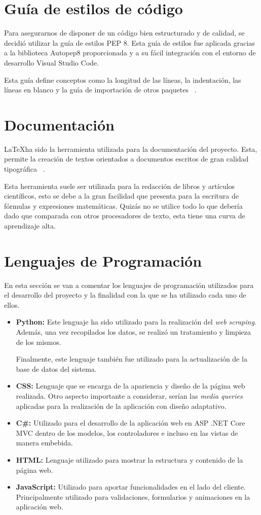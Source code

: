 \section{Guía de estilos de código}
Para asegurarnos de disponer de un código bien estructurado y de calidad, se decidió utilizar la guía de estilos PEP 8. Esta guía de estilos fue aplicada gracias a la biblioteca Autopep8 proporcionada y a su fácil integración con el entorno de desarrollo Visual Studio Code.  

Esta guía define conceptos como la longitud de las líneas, la indentación, las líneas en blanco y la guía de importación de otros paquetes ~\cite{pep8:latex}.

\section{Documentación}
\LaTeX \quad ha sido la herramienta utilizada para la documentación del proyecto. Esta, permite la creación de textos orientados a documentos escritos de gran calidad tipográfica ~\cite{latex:latex}.

Esta herramienta suele ser utilizada para la redacción de libros y artículos científicos, esto se debe a la gran facilidad que presenta para la escritura de fórmulas y expresiones matemáticas. Quizás no se utilice todo lo que debería dado que comparada con otros procesadores de texto, esta tiene una curva de aprendizaje alta.


\section{Lenguajes de Programación}
En esta sección se van a comentar los lenguajes de programación utilizados para el desarrollo del proyecto y la finalidad con la que se ha utilizado cada uno de ellos.

\begin{itemize}
    \item \textbf{Python:} Este lenguaje ha sido utilizado para la realización del \textit{web scraping}. Además, una vez recopilados los datos, se realizó un tratamiento y limpieza de los mismos.
    
    Finalmente, este lenguaje también fue utilizado para la actualización de la base de datos del sistema.
    \item \textbf{CSS:} Lenguaje que se encarga de la apariencia y diseño de la página web realizada. Otro aspecto importante a considerar, serían las \textit{media queries} aplicadas para la realización de la aplicación con diseño adaptativo.
    \item \textbf{C\#:} Utilizado para el desarrollo de la aplicación web en ASP .NET Core MVC dentro de los modelos, los controladores e incluso en las vistas de manera embebida.
    \item \textbf{HTML:} Lenguaje utilizado para mostrar la estructura y contenido de la página web.
    \item \textbf{JavaScript:} Utilizado para aportar funcionalidades en el lado del cliente. Principalmente utilizado para validaciones, formularios y animaciones en la aplicación web.
\end{itemize}

